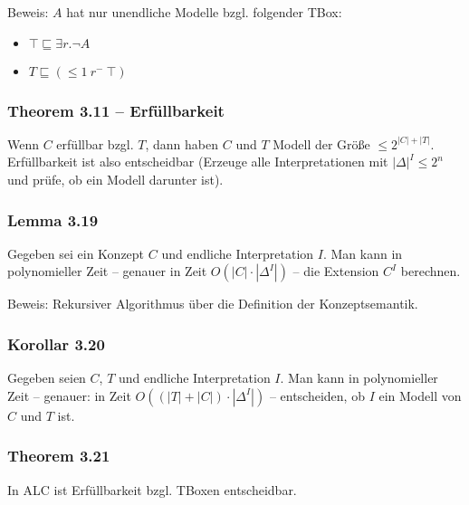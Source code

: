 Beweis: $A$ hat nur unendliche Modelle bzgl. folgender TBox:

\begin{itemize}
\item
  $\top \sqsubseteq \exists r.\neg A$
\item
  $T \sqsubseteq ( \leq 1\ r^{-}\ \top)$
\end{itemize}

\subsubsection{Theorem 3.11 --
Erfüllbarkeit}\label{theorem-3.11-erfuxfcllbarkeit}

Wenn $C$ erfüllbar bzgl. $T$, dann haben $C$ und $T$ Modell der
Größe $\leq 2^{\left| C \right| + \left| T \right|}$. Erfüllbarkeit
ist also entscheidbar (Erzeuge alle Interpretationen mit
$\left| \Delta \right|^{I} \leq 2^{n}$ und prüfe, ob ein Modell
darunter ist).

\subsubsection{Lemma 3.19}\label{lemma-3.19}

Gegeben sei ein Konzept $C$ und endliche Interpretation $I$. Man
kann in polynomieller Zeit -- genauer in Zeit
$O\left( \left| C \right| \cdot \left| \Delta^{I} \right| \right)$ --
die Extension $C^{I}$ berechnen.

Beweis: Rekursiver Algorithmus über die Definition der Konzeptsemantik.

\subsubsection{Korollar 3.20}\label{korollar-3.20}

Gegeben seien $C$, $T$ und endliche Interpretation $I$. Man kann
in polynomieller Zeit -- genauer: in Zeit
$O(\left( \left| T \right| + \left| C \right| \right) \cdot \left| \Delta^{I} \right|)$
-- entscheiden, ob $I$ ein Modell von $C$ und $T$ ist.

\subsubsection{Theorem 3.21}\label{theorem-3.21}

In ALC ist Erfüllbarkeit bzgl. TBoxen entscheidbar.